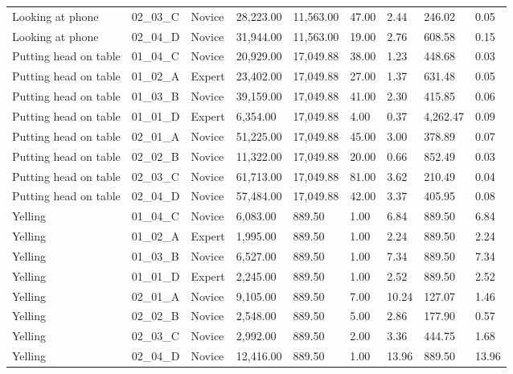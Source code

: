\documentclass[
  english,
  man,floatsintext]{apa6}
\begin{document}
\begin{table}[h]
\begin{center}
\begin{threeparttable}
{\begin{tabular}{lllllllll}
Looking at phone & 02\_03\_C & Novice & 28,223.00 & 11,563.00 & 47.00 & 2.44 & 246.02 & 0.05\\
Looking at phone & 02\_04\_D & Novice & 31,944.00 & 11,563.00 & 19.00 & 2.76 & 608.58 & 0.15\\
Putting head on table & 01\_04\_C & Novice & 20,929.00 & 17,049.88 & 38.00 & 1.23 & 448.68 & 0.03\\
Putting head on table & 01\_02\_A & Expert & 23,402.00 & 17,049.88 & 27.00 & 1.37 & 631.48 & 0.05\\
Putting head on table & 01\_03\_B & Novice & 39,159.00 & 17,049.88 & 41.00 & 2.30 & 415.85 & 0.06\\
Putting head on table & 01\_01\_D & Expert & 6,354.00 & 17,049.88 & 4.00 & 0.37 & 4,262.47 & 0.09\\
Putting head on table & 02\_01\_A & Novice & 51,225.00 & 17,049.88 & 45.00 & 3.00 & 378.89 & 0.07\\
Putting head on table & 02\_02\_B & Novice & 11,322.00 & 17,049.88 & 20.00 & 0.66 & 852.49 & 0.03\\
Putting head on table & 02\_03\_C & Novice & 61,713.00 & 17,049.88 & 81.00 & 3.62 & 210.49 & 0.04\\
Putting head on table & 02\_04\_D & Novice & 57,484.00 & 17,049.88 & 42.00 & 3.37 & 405.95 & 0.08\\
Yelling & 01\_04\_C & Novice & 6,083.00 & 889.50 & 1.00 & 6.84 & 889.50 & 6.84\\
Yelling & 01\_02\_A & Expert & 1,995.00 & 889.50 & 1.00 & 2.24 & 889.50 & 2.24\\
Yelling & 01\_03\_B & Novice & 6,527.00 & 889.50 & 1.00 & 7.34 & 889.50 & 7.34\\
Yelling & 01\_01\_D & Expert & 2,245.00 & 889.50 & 1.00 & 2.52 & 889.50 & 2.52\\
Yelling & 02\_01\_A & Novice & 9,105.00 & 889.50 & 7.00 & 10.24 & 127.07 & 1.46\\
Yelling & 02\_02\_B & Novice & 2,548.00 & 889.50 & 5.00 & 2.86 & 177.90 & 0.57\\
Yelling & 02\_03\_C & Novice & 2,992.00 & 889.50 & 2.00 & 3.36 & 444.75 & 1.68\\
Yelling & 02\_04\_D & Novice & 12,416.00 & 889.50 & 1.00 & 13.96 & 889.50 & 13.96\\
\bottomrule
\end{tabular}

}

\end{threeparttable}
\end{center}

\end{table}
\end{document}
